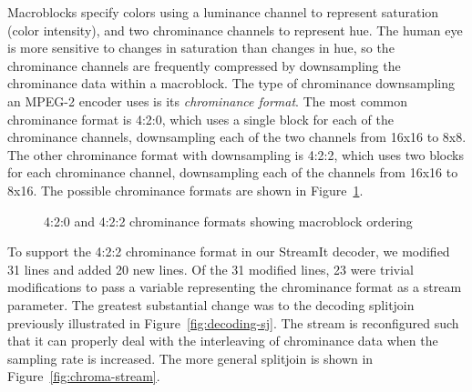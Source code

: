 
Macroblocks specify colors using a luminance channel to represent
saturation (color intensity), and two chrominance channels to
represent hue. The human eye is more sensitive to changes in
saturation than changes in hue, so the chrominance channels are
frequently compressed by downsampling the chrominance data within a
macroblock. The type of chrominance downsampling an MPEG-2 encoder
uses is its {\it chrominance format}. The most common chrominance
format is 4:2:0, which uses a single block for each of the chrominance
channels, downsampling each of the two channels from 16x16 to 8x8.
The other chrominance format with downsampling is 4:2:2, which uses
two blocks for each chrominance channel, downsampling each of the
channels from 16x16 to 8x16. The possible chrominance formats are
shown in Figure~\ref{fig:chroma-format}.

\begin{figure}
\caption{4:2:0 and 4:2:2 chrominance formats showing macroblock ordering}
\label{fig:chroma-format}
\end{figure}

To support the 4:2:2 chrominance format in our StreamIt decoder, we
modified 31 lines and added 20 new lines. Of the 31 modified lines, 23
were trivial modifications to pass a variable representing the
chrominance format as a stream parameter. The greatest substantial
change was to the decoding splitjoin previously illustrated in
Figure~\ref{fig:decoding-sj}. The stream is reconfigured such that it
can properly deal with the interleaving of chrominance data when the
sampling rate is increased. The more general splitjoin is shown in
Figure~\ref{fig:chroma-stream}.


